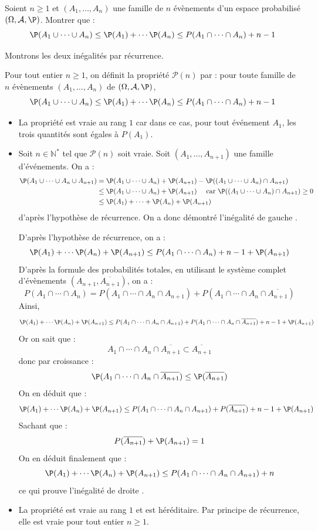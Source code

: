 \documentclass[a4paper,10pt]{report}
\begin{document}
\begin{Exercice}{} Soient $n \geq 1$ et $(A_1, \ldots, A_n)$ une famille de $n$ évènements d'un espace probabilisé $(\Omega, \mathcal{A}, \P)$. Montrer que :
$$ \P(A_1 \cup \cdots \cup A_n) \leq \P(A_1) + \cdots \P(A_n) \leq P(A_1 \cap \cdots \cap A_n) + n-1$$
\end{Exercice}

\corr Montrons les deux inégalités par récurrence.

\medskip

\noindent Pour tout entier $n \geq 1$, on définit la propriété $\mathcal{P}(n)$ par : pour toute famille de $n$ évènements $(A_1, \ldots, A_n)$ de $(\Omega, \mathcal{A}, \P)$, 
$$ \P(A_1 \cup \cdots \cup A_n) \leq \P(A_1) + \cdots \P(A_n) \leq P(A_1 \cap \cdots \cap A_n) + n-1$$

\begin{itemize}
\item La propriété est vraie au rang $1$ car dans ce cas, pour tout événement $A_1$, les trois quantités sont égales à $P(A_1)$.
\item Soit $n \in \mathbb{N}^*$ tel que $\mathcal{P}(n)$ soit vraie. Soit $(A_1, \ldots, A_{n+1})$ une famille d'événements. On a :
\begin{align*}
\P(A_1 \cup \cdots \cup A_n \cup A_{n+1}) & = \P(A_1 \cup \cdots  \cup A_{n}) + \P(A_{n+1}) - \P((A_1 \cup \cdots \cup A_n) \cap A_{n+1}) \\
& \leq \P(A_1 \cup \cdots  \cup A_{n}) + \P(A_{n+1}) \quad \hbox{ car } \P((A_1 \cup \cdots \cup A_n) \cap A_{n+1}) \geq 0 \\
& \leq \P(A_1) + \cdots + \P(A_n) + \P(A_{n+1})
\end{align*}
d'après l'hypothèse de récurrence. On a donc démontré l'inégalité \og de gauche \fg.

\medskip

\noindent D'après l'hypothèse de récurrence, on a :
$$  \P(A_1) + \cdots \P(A_n) + \P(A_{n+1}) \leq P(A_1 \cap \cdots \cap A_n) + n-1  + \P(A_{n+1})$$
D'après la formule des probabilités totales, en utilisant le système complet d'évènements $(A_{n+1}, \overline{A_{n+1}})$, on a :
$$ P(A_1 \cap \cdots \cap A_n) = P(A_1 \cap \cdots \cap A_n \cap A_{n+1}) + P(A_1 \cap \cdots \cap A_n \cap \overline{A_{n+1}})$$
Ainsi,
$$ \P(A_1) + \cdots \P(A_n) + \P(A_{n+1}) \leq P(A_1 \cap \cdots \cap A_n \cap A_{n+1}) + P(A_1 \cap \cdots \cap A_n \cap \overline{A_{n+1}}) + n-1  + \P(A_{n+1})$$
Or on sait que :
$$ A_1 \cap \cdots \cap A_n \cap \overline{A_{n+1}} \subset \overline{A_{n+1}}$$
donc par croissance :
$$ \P(A_1 \cap \cdots \cap A_n \cap \overline{A_{n+1}}) \leq \P(\overline{A_{n+1}})$$
On en déduit que : 
$$ \P(A_1) + \cdots \P(A_n) + \P(A_{n+1}) \leq P(A_1 \cap \cdots \cap A_n \cap A_{n+1}) + P(\overline{A_{n+1}}) + n-1  + \P(A_{n+1})$$
Sachant que :
$$ P(\overline{A_{n+1}}) + \P(A_{n+1})=1$$
On en déduit finalement que :
$$  \P(A_1) + \cdots \P(A_n) + \P(A_{n+1}) \leq P(A_1 \cap \cdots \cap A_n \cap A_{n+1}) +n $$
ce qui prouve l'inégalité \og de droite \fg.
\item La propriété est vraie au rang $1$ et est héréditaire. Par principe de récurrence, elle est vraie pour tout entier $n \geq 1$.
\end{itemize}
\end{document}
